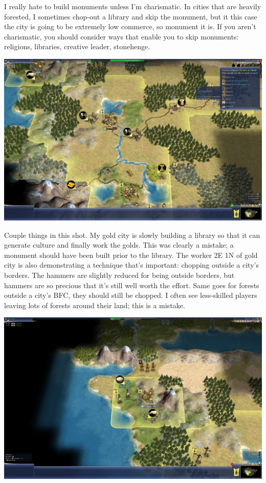 \documentclass[10pt]{article}
\begin{document}
I really hate to build monuments unless I'm charismatic. In cities that are heavily forested, I sometimes
chop-out a library and skip the monument, but it this case the city is going to be extremely low commerce,
so monument it is. If you aren't charismatic, you should consider ways that enable you to skip monuments:
religions, libraries, creative leader, stonehenge.

\includegraphics[width=1.0\textwidth]{31}

Couple things in this shot. My gold city is slowly building a library so that it can generate culture and
finally work the golds. This was clearly a mistake; a monument should have been built prior to the library.
The worker 2E 1N of gold city is also demonstrating a technique that's important: chopping outside a city's
borders. The hammers are slightly reduced for being outside borders, but hammers are so precious that it's
still well worth the effort. Same goes for forests outside a city's BFC, they should still be chopped. I
often see less-skilled players leaving lots of forests around their land; this is a mistake.

\includegraphics[width=1.0\textwidth]{34}
\end{document}
